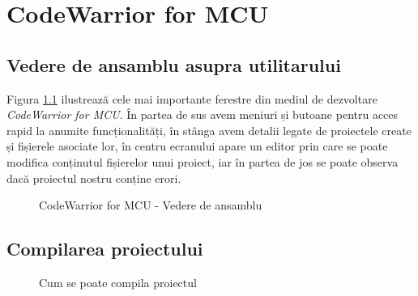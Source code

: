 \chapter{CodeWarrior for MCU}

\section{Vedere de ansamblu asupra utilitarului}
Figura \ref{fig:CodeWarrior-VedereDeAnsamblu} ilustrează cele mai importante ferestre din mediul de dezvoltare \textit{CodeWarrior for MCU}. În partea de sus avem meniuri și butoane pentru acces rapid la anumite funcționalități, în stânga avem detalii legate de proiectele create și fișierele asociate lor, în centru ecranului apare un editor prin care se poate modifica conținutul fișierelor unui proiect, iar în partea de jos se poate observa dacă proiectul nostru conține erori.

\begin{figure}[h!]
  \vspace{-20pt}
  \vspace{-15pt}
  \caption{\label{fig:CodeWarrior-VedereDeAnsamblu} CodeWarrior for MCU - Vedere de ansamblu}
  \vspace{-20pt}
\end{figure}

\section{Compilarea proiectului}

\begin{figure}
  \vspace{-20pt}
  \vspace{-15pt}
  \caption{\label{fig:CodeWarrior-CompilareProiect} Cum se poate compila proiectul}
  \vspace{-20pt}
\end{figure}

